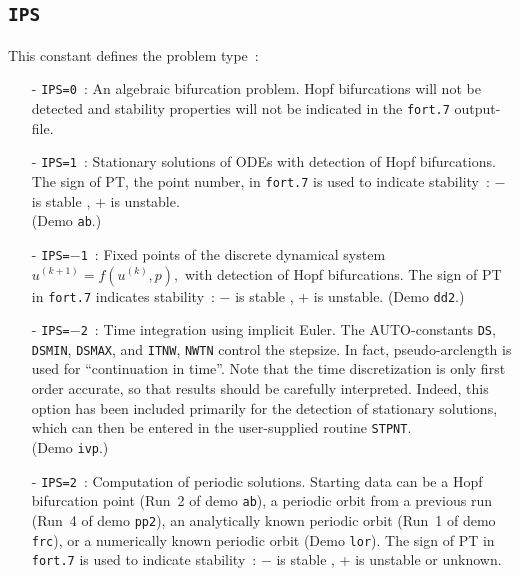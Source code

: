 \documentclass[12pt]{report}
\begin{document}
\subsection{\texttt{IPS}}  \label{sec:IPS}
This constant defines the problem type~:
\begin{itemize}
\item[-] {\tt IPS=0}~: 
  An algebraic bifurcation problem.
  Hopf bifurcations will not be detected and stability
  properties will not be indicated in the {\tt fort.7} output-file.
\item[-] {\tt IPS=1}~: 
  Stationary solutions of ODEs with detection of Hopf bifurcations.
  The sign of PT, the point number, in {\tt fort.7} is used 
  to indicate stability~: $-$ is stable , + is unstable.\\
 (Demo {\tt ab}.)
\item[-] {\tt IPS=$-$1}~:  
  Fixed points of the discrete dynamical system
  $u^{(k+1)}=f(u^{(k)},p ),$ with detection of Hopf bifurcations.
  The sign of PT in {\tt fort.7} indicates stability~: 
  $-$ is stable , + is unstable.  
 (Demo {\tt dd2}.)
\item[-] {\tt IPS=$-$2}~: 
  Time integration using implicit Euler. 
  The {\cal AUTO}-constants {\tt DS}, {\tt DSMIN}, {\tt DSMAX}, and {\tt ITNW}, {\tt NWTN} control 
  the stepsize.
  In fact, pseudo-arclength is used for ``continuation in time''. 
  Note that the time discretization is only first order accurate, 
  so that results should be carefully interpreted. 
  Indeed, this option has been included primarily for the detection 
  of stationary solutions, which can then be entered in the user-supplied
  routine {\tt STPNT}.  \\  
 (Demo {\tt ivp}.)
\item[-]  {\tt IPS=2}~:
  Computation of periodic solutions. Starting data can be
  a Hopf bifurcation point (Run~2 of demo {\tt ab}),
  a periodic orbit from a previous run (Run~4 of demo {\tt pp2}),
  an analytically known periodic orbit (Run~1 of demo {\tt frc}),
  or a numerically known periodic orbit (Demo {\tt lor}).
  The sign of PT in {\tt fort.7} is used to indicate
  stability~: $-$ is stable , + is unstable or unknown.

\end{itemize}
\end{document}
